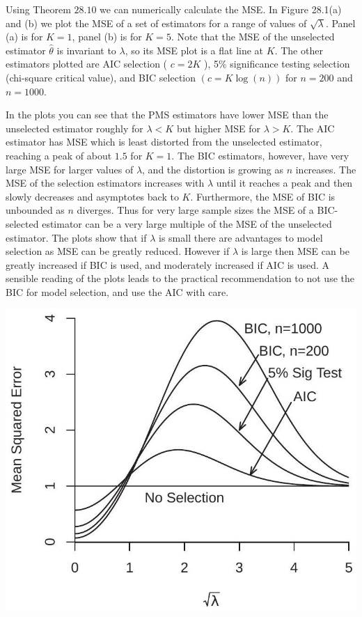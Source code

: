 \documentclass[10pt]{article}
\begin{document}
Using Theorem $28.10$ we can numerically calculate the MSE. In Figure 28.1(a) and (b) we plot the MSE of a set of estimators for a range of values of $\sqrt{\lambda}$. Panel (a) is for $K=1$, panel (b) is for $K=5$. Note that the MSE of the unselected estimator $\widehat{\theta}$ is invariant to $\lambda$, so its MSE plot is a flat line at $K$. The other estimators plotted are AIC selection ( $c=2 K$ ), 5\% significance testing selection (chi-square critical value), and BIC selection $(c=K \log (n))$ for $n=200$ and $n=1000$.

In the plots you can see that the PMS estimators have lower MSE than the unselected estimator roughly for $\lambda<K$ but higher MSE for $\lambda>K$. The AIC estimator has MSE which is least distorted from the unselected estimator, reaching a peak of about $1.5$ for $K=1$. The BIC estimators, however, have very large MSE for larger values of $\lambda$, and the distortion is growing as $n$ increases. The MSE of the selection estimators increases with $\lambda$ until it reaches a peak and then slowly decreases and asymptotes back to $K$. Furthermore, the MSE of BIC is unbounded as $n$ diverges. Thus for very large sample sizes the MSE of a BIC-selected estimator can be a very large multiple of the MSE of the unselected estimator. The plots show that if $\lambda$ is small there are advantages to model selection as MSE can be greatly reduced. However if $\lambda$ is large then MSE can be greatly increased if BIC is used, and moderately increased if AIC is used. A sensible reading of the plots leads to the practical recommendation to not use the BIC for model selection, and use the AIC with care.

\includegraphics[max width=\textwidth]{2022_10_23_101d59f261a704807a3bg-23}
\end{document}
